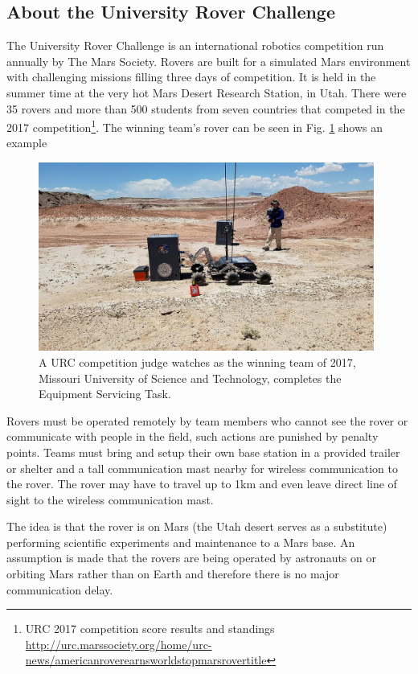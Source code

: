 \documentclass[runningheads,a4paper]{llncs}
\begin{document}
\subsection{About the University Rover Challenge}\label{aboutURC}
The University Rover Challenge is an international robotics competition run annually by The Mars Society. Rovers are built for a simulated Mars environment with challenging missions filling three days of competition. It is held in the summer time at the very hot Mars Desert Research Station, in Utah. There were 35 rovers and more than 500 students from seven countries that competed in the 2017 competition\footnote{URC 2017 competition score results and standings \url{http://urc.marssociety.org/home/urc-news/americanroverearnsworldstopmarsrovertitle}}. The winning team's rover can be seen in Fig. \ref{fig:winning_team} shows an example
\begin{figure}
\centering
\includegraphics[height=6.2cm]{winning_team}
\caption{A URC competition judge watches as the winning team of 2017, Missouri University of Science and Technology, completes the Equipment Servicing Task.}
\label{fig:winning_team}
\end{figure}

Rovers must be operated remotely by team members who cannot see the rover or communicate with people in the field, such actions are punished by penalty points. Teams must bring and setup their own base station in a provided trailer or shelter and a tall communication mast nearby for wireless communication to the rover. The rover may have to travel up to 1km and even leave direct line of sight to the wireless communication mast. 

The idea is that the rover is on Mars (the Utah desert serves as a substitute) performing scientific experiments and maintenance to a Mars base. An assumption is made that the rovers are being operated by astronauts on or orbiting Mars rather than on Earth and therefore there is no major communication delay. 
\end{document}
